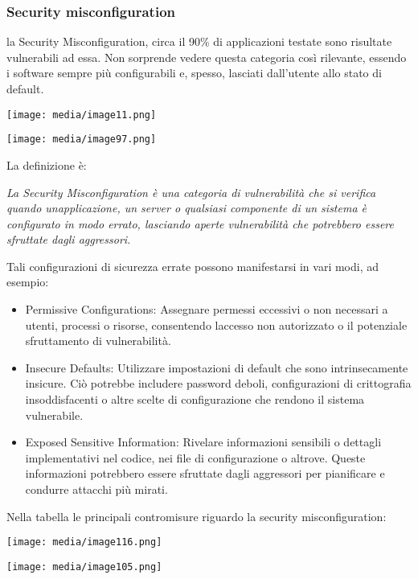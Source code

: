\subsubsection{Security
misconfiguration}\label{security-misconfiguration}

la Security Misconfiguration, circa il 90\% di applicazioni testate sono
risultate vulnerabili ad essa. Non sorprende vedere questa categoria
così rilevante, essendo i software sempre più configurabili e, spesso,
lasciati dall'utente allo stato di default.

\texttt{[image: media/image11.png]}

\texttt{[image: media/image97.png]}

La definizione è:

\emph{La Security Misconfiguration è una categoria di vulnerabilità che
si verifica quando un\textquotesingle applicazione, un server o
qualsiasi componente di un sistema è configurato in modo errato,
lasciando aperte vulnerabilità che potrebbero essere sfruttate dagli
aggressori.}

Tali configurazioni di sicurezza errate possono manifestarsi in vari
modi, ad esempio:

\begin{itemize}
\item
  Permissive Configurations: Assegnare permessi eccessivi o non
  necessari a utenti, processi o risorse, consentendo
  l\textquotesingle accesso non autorizzato o il potenziale sfruttamento
  di vulnerabilità.
\item
  Insecure Defaults: Utilizzare impostazioni di default che sono
  intrinsecamente insicure. Ciò potrebbe includere password deboli,
  configurazioni di crittografia insoddisfacenti o altre scelte di
  configurazione che rendono il sistema vulnerabile.
\item
  Exposed Sensitive Information: Rivelare informazioni sensibili o
  dettagli implementativi nel codice, nei file di configurazione o
  altrove. Queste informazioni potrebbero essere sfruttate dagli
  aggressori per pianificare e condurre attacchi più mirati.
\end{itemize}

Nella tabella le principali contromisure riguardo la security
misconfiguration:

\texttt{[image: media/image116.png]}

\texttt{[image: media/image105.png]}

